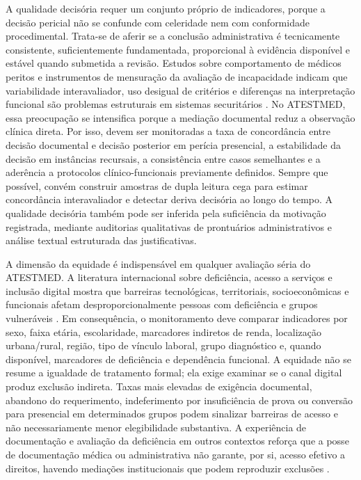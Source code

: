 \documentclass[12pt,a4paper]{article}
\begin{document}
A qualidade decisória requer um conjunto próprio de indicadores, porque a decisão pericial não se confunde com celeridade nem com conformidade procedimental. Trata-se de aferir se a conclusão administrativa é tecnicamente consistente, suficientemente fundamentada, proporcional à evidência disponível e estável quando submetida a revisão. Estudos sobre comportamento de médicos peritos e instrumentos de mensuração da avaliação de incapacidade indicam que variabilidade interavaliador, uso desigual de critérios e diferenças na interpretação funcional são problemas estruturais em sistemas securitários \parencite{steenbeek2011thedevelopmentofinstrumentstomeasuretheworkdisa, dijkstrasdatamakingupincapacityforwork}. No ATESTMED, essa preocupação se intensifica porque a mediação documental reduz a observação clínica direta. Por isso, devem ser monitoradas a taxa de concordância entre decisão documental e decisão posterior em perícia presencial, a estabilidade da decisão em instâncias recursais, a consistência entre casos semelhantes e a aderência a protocolos clínico-funcionais previamente definidos. Sempre que possível, convém construir amostras de dupla leitura cega para estimar concordância interavaliador e detectar deriva decisória ao longo do tempo. A qualidade decisória também pode ser inferida pela suficiência da motivação registrada, mediante auditorias qualitativas de prontuários administrativos e análise textual estruturada das justificativas.

A dimensão da equidade é indispensável em qualquer avaliação séria do ATESTMED. A literatura internacional sobre deficiência, acesso a serviços e inclusão digital mostra que barreiras tecnológicas, territoriais, socioeconômicas e funcionais afetam desproporcionalmente pessoas com deficiência e grupos vulneráveis \parencite{albasheer2026telemedicineutilizationanddigitalinclusionamongpe, m2024astudyofdisabilityseveritybarriersandfacilitatingfactor, gao2019disabilityconcentrationandaccesstorehabilitationservice, mackett2025ametareviewofliteraturereviewsofdisabilitytravel}. Em consequência, o monitoramento deve comparar indicadores por sexo, faixa etária, escolaridade, marcadores indiretos de renda, localização urbana/rural, região, tipo de vínculo laboral, grupo diagnóstico e, quando disponível, marcadores de deficiência e dependência funcional. A equidade não se resume a igualdade de tratamento formal; ela exige examinar se o canal digital produz exclusão indireta. Taxas mais elevadas de exigência documental, abandono do requerimento, indeferimento por insuficiência de prova ou conversão para presencial em determinados grupos podem sinalizar barreiras de acesso e não necessariamente menor elegibilidade substantiva. A experiência de documentação e avaliação da deficiência em outros contextos reforça que a posse de documentação médica ou administrativa não garante, por si, acesso efetivo a direitos, havendo mediações institucionais que podem reproduzir exclusões \parencite{rajasulochana2026doeshavingadisabilitycertificateensurebenefit, sa2020medicalcertificateofdisabilityadescriptiveanalysisofav, hospital2016mentaldisabilityaretrospectivestudyofsocioclinica, deveau2011workplaceaccommodationandauditbasedevaluationprocess}.
\end{document}
